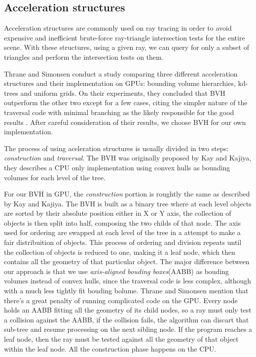 \documentclass{vgtc}
\begin{document}
\subsection{Acceleration structures}

Acceleration structures are commonly used on ray tracing in order to
avoid expensive and inefficient brute-force ray-triangle intersection
tests for the entire scene. With these structures, using a given ray,
we can query for only a subset of triangles and perform the
intersection tests on them.

Thrane and Simonsen conduct a study comparing three different
acceleration structures and their implementation on GPUs: bounding
volume hierarchies, kd-trees and uniform grids. On their experiments,
they concluded that BVH outperform the other two except for a few
cases, citing the simpler nature of the traversal code with minimal
branching as the likely responsible for the good results
\cite{Thrane}. After careful consideration of their results, we choose
BVH for our own implementation.

The process of using aceleration structures is usually divided in two
steps: \emph{construction} and \emph{traversal}. The BVH was
originally proposed by Kay and Kajiya\cite{kay1986ray}, they describes
a CPU only implementation using convex hulls as bounding volumes for
each level of the tree.

For our BVH in GPU, the \emph{construction} portion is roughtly the
same as described by Kay and Kajiya. The BVH is built as a binary tree
where at each level objects are sorted by their absolute position
either in X or Y axis, the collection of objects is then split into
half, composing the two childs of that node. The axis used for
ordering are swapped at each level of the tree in a attempt to make a
fair distribuition of objects. This process of ordering and division
repeats until the collection of objects is reduced to one, making it a
leaf node, which then contains all the geometry of that particular
object. The major difference between our approach is that we use
\emph{axis-aligned bouding boxes}(AABB) as bouding volumes instead of
convex hulls, since the traversal code is less complex, although with
a much less tightly fit bouding bolume. Thrane and Simonsen mention
that there's a great penalty of running complicated code on the
GPU\cite{Thrane}. Every node holds an AABB fitting all the geometry of
its child nodes, so a ray must only test a collision against the AABB,
if the collision fails, the algorithm can discart that sub-tree and
resume processing on the next sibling node. If the program reaches a
leaf node, then the ray must be tested against all the geometry of
that object within the leaf node. All the construction phase happens
on the CPU.
\end{document}
